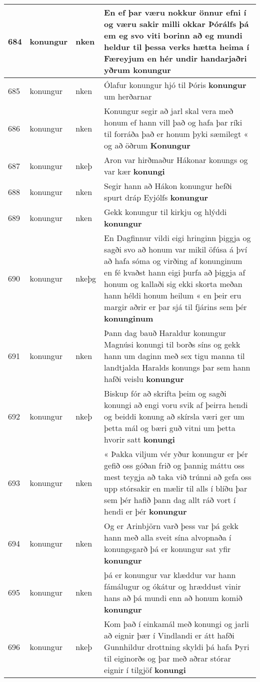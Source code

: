 \documentclass{article}
\begin{document}
\begin{longtable}{p{1cm}|p{1cm}|p{1cm}|p{13cm}}
\hline
684&konungur&nken&En ef þar væru nokkur önnur efni í og væru sakir milli okkar Þórálfs þá em eg svo viti borinn að eg mundi heldur til þessa verks hætta heima í Færeyjum en hér undir handarjaðri yðrum \textbf{konungur} \\
\hline
685&konungur&nken&Ólafur konungur hjó til Þóris \textbf{konungur} um herðarnar\\
\hline
686&konungur&nken&Konungur segir að jarl skal vera með honum ef hann vill það og hafa þar ríki til forráða það er honum þyki sæmilegt « og að öðrum \textbf{Konungur} \\
\hline
687&konungur&nkeþ&Aron var hirðmaður Hákonar konungs og var kær \textbf{konungi} \\
\hline
688&konungur&nken&Segir hann að Hákon konungur hefði spurt dráp Eyjólfs \textbf{konungur} \\
\hline
689&konungur&nken&Gekk konungur til kirkju og hlýddi \textbf{konungur} \\
\hline
690&konungur&nkeþg&En Dagfinnur vildi eigi hringinn þiggja og sagði svo að honum var mikil öfúsa á því að hafa sóma og virðing af konunginum en fé kvaðst hann eigi þurfa að þiggja af honum og kallaði sig ekki skorta meðan hann héldi honum heilum « en þeir eru margir aðrir er þar sjá til fjárins sem þér \textbf{konunginum} \\
\hline
691&konungur&nken&Þann dag bauð Haraldur konungur Magnúsi konungi til borðs síns og gekk hann um daginn með sex tigu manna til landtjalda Haralds konungs þar sem hann hafði veislu \textbf{konungur} \\
\hline
692&konungur&nkeþ&Biskup fór að skrifta þeim og sagði konungi að engi voru svik af þeirra hendi og beiddi konung að skírsla væri ger um þetta mál og bæri guð vitni um þetta hvorir satt \textbf{konungi} \\
\hline
693&konungur&nken&« Þakka viljum vér yður konungur er þér gefið oss góðan frið og þannig máttu oss mest teygja að taka við trúnni að gefa oss upp stórsakir en mælir til alls í blíðu þar sem þér hafið þann dag allt ráð vort í hendi er þér \textbf{konungur} \\
\hline
694&konungur&nken&Og er Arinbjörn varð þess var þá gekk hann með alla sveit sína alvopnaða í konungsgarð þá er konungur sat yfir \textbf{konungur} \\
\hline
695&konungur&nken&þá er konungur var klæddur var hann fámálugur og ókátur og hræddust vinir hans að þá mundi enn að honum komið \textbf{konungur} \\
\hline
696&konungur&nkeþ&Kom það í einkamál með konungi og jarli að eignir þær í Vindlandi er átt hafði Gunnhildur drottning skyldi þá hafa Þyri til eiginorðs og þar með aðrar stórar eignir í tilgjöf \textbf{konungi} \\

\end{longtable}
\end{document}
